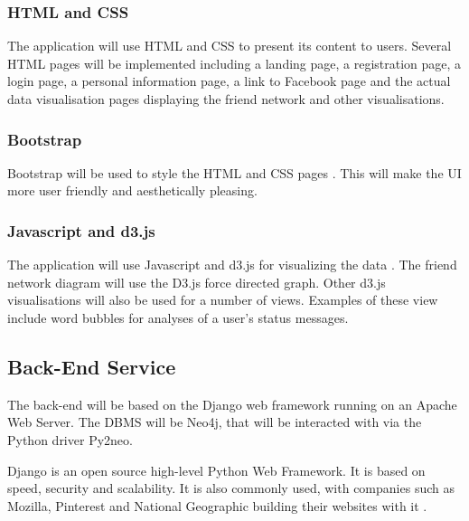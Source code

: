 \documentclass[12pt,onecolumn]{article}
\begin{document}
	\subsubsection*{HTML and CSS}
	The application will use HTML and CSS to present its content to users. Several HTML pages will be implemented including a landing page, a registration page, a login page, a personal information page, a link to Facebook page and the actual data visualisation pages displaying the friend network and other visualisations.

	\subsubsection*{Bootstrap}
	Bootstrap will be used to style the HTML and CSS pages \cite{Bootstrap}. This will make the UI more user friendly and aesthetically pleasing.

	\subsubsection*{Javascript and d3.js}
	The application will use Javascript and d3.js for visualizing the data \cite{D3}. The friend network diagram will use the D3.js force directed graph. Other d3.js visualisations will also be used for a number of views. Examples of these view include word bubbles for analyses of a user's status messages.

	\subsection{Back-End Service} \label{backsec}

	The back-end will be based on the Django web framework running on an Apache Web Server. The DBMS will be Neo4j, that will be interacted with via the Python driver Py2neo. 


	Django is an open source high-level Python Web Framework. It is based on speed, security and scalability. It is also commonly used, with companies such as Mozilla, Pinterest and National Geographic building their websites with it \cite{django}. 
\end{document}
